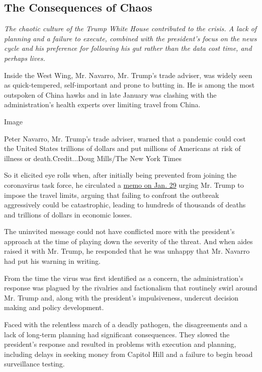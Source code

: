 \hypertarget{the-consequences-of-chaos}{%
\subsection{The Consequences of Chaos}\label{the-consequences-of-chaos}}

\emph{The chaotic culture of the Trump White House contributed to the
crisis. A lack of planning and a failure to execute, combined with the
president's focus on the news cycle and his preference for following his
gut rather than the data cost time, and perhaps lives.}

Inside the West Wing, Mr. Navarro, Mr. Trump's trade adviser, was widely
seen as quick-tempered, self-important and prone to butting in. He is
among the most outspoken of China hawks and in late January was clashing
with the administration's health experts over limiting travel from
China.

Image

Peter Navarro, Mr. Trump's trade adviser, warned that a pandemic could
cost the United States trillions of dollars and put millions of
Americans at risk of illness or death.Credit...Doug Mills/The New York
Times

So it elicited eye rolls when, after initially being prevented from
joining the coronavirus task force, he circulated a
\href{https://www.nytimes.com/2020/04/06/us/politics/navarro-warning-trump-coronavirus.html}{memo
on Jan. 29} urging Mr. Trump to impose the travel limits, arguing that
failing to confront the outbreak aggressively could be catastrophic,
leading to hundreds of thousands of deaths and trillions of dollars in
economic losses.

The uninvited message could not have conflicted more with the
president's approach at the time of playing down the severity of the
threat. And when aides raised it with Mr. Trump, he responded that he
was unhappy that Mr. Navarro had put his warning in writing.

From the time the virus was first identified as a concern, the
administration's response was plagued by the rivalries and factionalism
that routinely swirl around Mr. Trump and, along with the president's
impulsiveness, undercut decision making and policy development.

Faced with the relentless march of a deadly pathogen, the disagreements
and a lack of long-term planning had significant consequences. They
slowed the president's response and resulted in problems with execution
and planning, including delays in seeking money from Capitol Hill and a
failure to begin broad surveillance testing.


